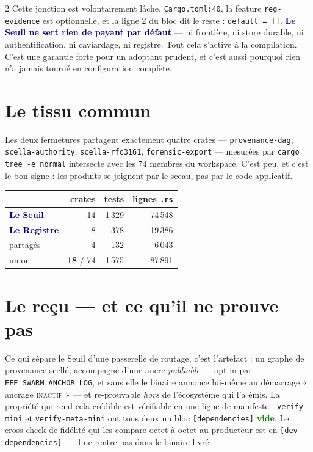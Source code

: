 \documentclass[9pt]{extarticle}
\newcommand{\code}[1]{\texttt{\footnotesize #1}}
\newcommand{\mm}[1]{\textbf{\textcolor{navy}{#1}}}
\newcommand{\ok}[1]{\textcolor{green}{\textbf{#1}}}
\begin{document}
\begin{multicols}{2}
Cette jonction est volontairement lâche. \code{Cargo.toml:40}, la feature \code{reg-evidence} est optionnelle, et la ligne 2 du bloc dit le reste : \code{default = []}. \mm{Le Seuil ne sert rien de payant par défaut} — ni frontière, ni store durable, ni authentification, ni caviardage, ni registre. Tout cela s'active à la compilation. C'est une garantie forte pour un adoptant prudent, et c'est aussi pourquoi rien n'a jamais tourné en configuration complète.

\section{Le tissu commun}
Les deux fermetures partagent exactement quatre crates — \code{provenance-dag}, \code{scella-authority}, \code{scella-rfc3161}, \code{forensic-export} — mesurées par \code{cargo tree -e normal} intersecté avec les 74 membres du workspace. C'est peu, et c'est le bon signe : les produits se joignent par le sceau, pas par le code applicatif.

\begin{center}\footnotesize
\begin{tabular}{@{}l r r r@{}}
\toprule
 & crates & tests & lignes \code{.rs}\\
\midrule
\mm{Le Seuil} & 14 & 1\,329 & 74\,548\\
\mm{Le Registre} & 8 & 378 & 19\,386\\
partagés & 4 & 132 & 6\,043\\
\midrule
union & \textbf{18} / 74 & 1\,575 & 87\,891\\
\bottomrule
\end{tabular}
\end{center}

\section{Le reçu — et ce qu'il ne prouve pas}
Ce qui sépare le Seuil d'une passerelle de routage, c'est l'artefact : un graphe de provenance scellé, accompagné d'une ancre \emph{publiable} — opt-in par \code{EFE\_SWARM\_ANCHOR\_LOG}, et sans elle le binaire annonce lui-même au démarrage « ancrage \textsc{inactif} » — et re-prouvable \emph{hors} de l'écosystème qui l'a émis. La propriété qui rend cela crédible est vérifiable en une ligne de manifeste : \code{verify-mini} et \code{verify-meta-mini} ont tous deux un bloc \code{[dependencies]} \ok{vide}. Le cross-check de fidélité qui les compare octet à octet au producteur est en \code{[dev-dependencies]} — il ne rentre pas dans le binaire livré.


\end{multicols}
\end{document}
